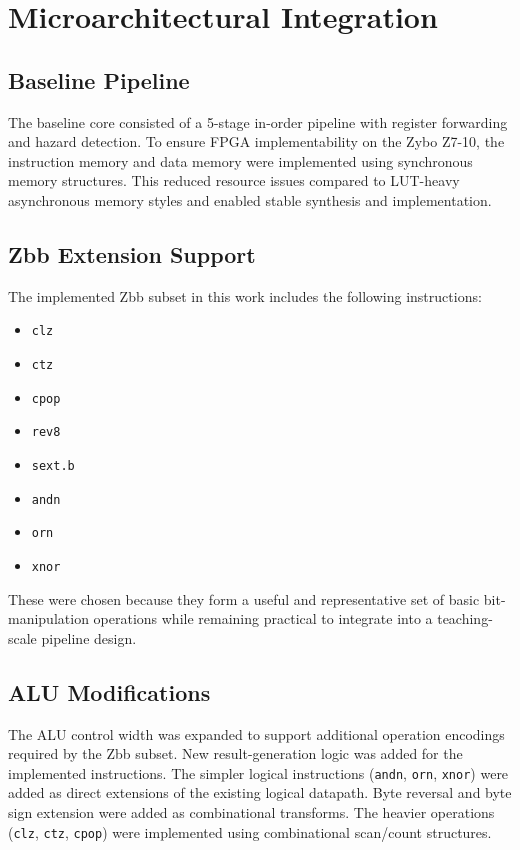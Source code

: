 \documentclass[conference]{IEEEtran}
\begin{document}
	\section{Microarchitectural Integration}
	\subsection{Baseline Pipeline}
	The baseline core consisted of a 5-stage in-order pipeline with register forwarding and hazard detection. To ensure FPGA implementability on the Zybo Z7-10, the instruction memory and data memory were implemented using synchronous memory structures. This reduced resource issues compared to LUT-heavy asynchronous memory styles and enabled stable synthesis and implementation.
	
	\subsection{Zbb Extension Support}
	The implemented Zbb subset in this work includes the following instructions:
	\begin{itemize}
		\item \texttt{clz}
		\item \texttt{ctz}
		\item \texttt{cpop}
		\item \texttt{rev8}
		\item \texttt{sext.b}
		\item \texttt{andn}
		\item \texttt{orn}
		\item \texttt{xnor}
	\end{itemize}
	
	These were chosen because they form a useful and representative set of basic bit-manipulation operations while remaining practical to integrate into a teaching-scale pipeline design.
	
	\subsection{ALU Modifications}
	The ALU control width was expanded to support additional operation encodings required by the Zbb subset. New result-generation logic was added for the implemented instructions. The simpler logical instructions (\texttt{andn}, \texttt{orn}, \texttt{xnor}) were added as direct extensions of the existing logical datapath. Byte reversal and byte sign extension were added as combinational transforms. The heavier operations (\texttt{clz}, \texttt{ctz}, \texttt{cpop}) were implemented using combinational scan/count structures.
	
\end{document}
